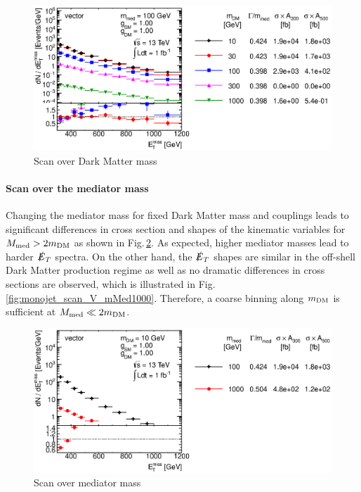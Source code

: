 \begin{figure}
\centering
\includegraphics[width=0.9\linewidth]{figures/monojet/scan_mDM_V_100.eps}
\caption{Scan over Dark Matter mass}
\label{fig:monojet_scan_V_mDM100}
\end{figure}


\paragraph{Scan over the mediator mass}

Changing the mediator mass for fixed Dark Matter mass and couplings leads to significant differences in cross section and shapes of the kinematic variables for $M_{\rm{med}}>2m_{\rm{DM}}$ as shown in Fig.\,\ref{fig:monojet_scan_V_mMed10}. As expected, higher mediator masses lead to harder $\slashed{E}_T$ spectra.
On the other hand, the $\slashed{E}_T$ shapes are similar in the off-shell Dark Matter production regime as well as no dramatic differences in cross sections are observed, which is illustrated in Fig.\,\ref{fig:monojet_scan_V_mMed1000}. Therefore, a coarse binning along $m_{\rm{DM}}$ is sufficient at $M_{\rm{med}} \ll 2m_{\rm{DM}}$.

\begin{figure}
\centering
\includegraphics[width=0.9\linewidth]{figures/monojet/scan_mMed_V_10.eps}
\caption{Scan over mediator mass}
\label{fig:monojet_scan_V_mMed10}
\end{figure}

